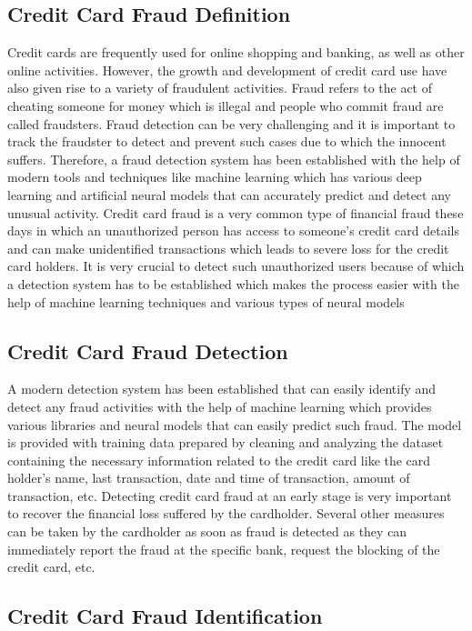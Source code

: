 \subsection{Credit Card Fraud Definition}

Credit cards are frequently used for online shopping and banking, as well as other online activities. However, the growth and development of credit card use have also given rise to a variety of fraudulent activities. Fraud refers to the act of cheating someone for money which is illegal and people who commit fraud are called fraudsters. Fraud detection can be very challenging and it is important to track the fraudster to detect and prevent such cases due to which the innocent suffers. Therefore, a fraud detection system has been established with the help of modern tools and techniques like machine learning which has various deep learning and artificial neural models that can accurately predict and detect any unusual activity. Credit card fraud is a very common type of financial fraud these days in which an unauthorized person has access to someone’s credit card details and can make unidentified transactions which leads to severe loss for the credit card holders. It is very crucial to detect such unauthorized users because of which a detection system has to be established which makes the process easier with the help of machine learning techniques and various types of neural models 
\subsection{Credit Card Fraud Detection}

A modern detection system has been established that can easily identify and detect any fraud activities with the help of machine learning which provides various libraries and neural models that can easily predict such fraud. The model is provided with training data prepared by cleaning and analyzing the dataset containing the necessary information related to the credit card like the card holder's name, last transaction, date and time of transaction, amount of transaction, etc. Detecting credit card fraud at an early stage is very important to recover the financial loss suffered by the cardholder. Several other measures can be taken by the cardholder as soon as fraud is detected as they can immediately report the fraud at the specific bank, request the blocking of the credit card, etc. 
\subsection{Credit Card Fraud Identification}

